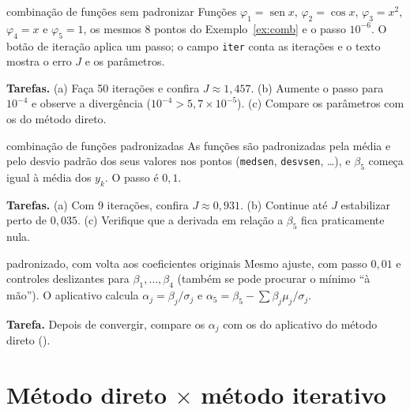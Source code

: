 \begin{atividade}{combinação de funções sem padronizar}{\arqGDComb}
Funções $\varphi_1=\operatorname{sen}x$, $\varphi_2=\cos x$, $\varphi_3=x^2$, $\varphi_4=x$ e $\varphi_5=1$,
os mesmos 8 pontos do Exemplo~\ref{ex:comb} e o passo $10^{-6}$. O botão de iteração aplica um passo; o campo
\texttt{iter} conta as iterações e o texto mostra o erro $J$ e os parâmetros.

\textbf{Tarefas.} (a) Faça 50 iterações e confira $J\approx1{,}457$. (b) Aumente o passo para $10^{-4}$ e
observe a divergência ($10^{-4}>5{,}7\times10^{-5}$). (c) Compare os parâmetros com os do método direto.
\end{atividade}

\begin{atividade}{combinação de funções padronizadas}{\arqGDEsc}
As funções são padronizadas pela média e pelo desvio padrão dos seus valores nos pontos
(\texttt{medsen}, \texttt{desvsen}, \dots), e $\beta_5$ começa igual à média dos $y_k$. O passo é $0{,}1$.

\textbf{Tarefas.} (a) Com 9 iterações, confira $J\approx0{,}931$. (b) Continue até $J$ estabilizar perto de
$0{,}035$. (c) Verifique que a derivada em relação a $\beta_5$ fica praticamente nula.
\end{atividade}

\begin{atividade}{padronizado, com volta aos coeficientes originais}{\arqGDPadr}
Mesmo ajuste, com passo $0{,}01$ e controles deslizantes para $\beta_1,\dots,\beta_4$ (também se pode
procurar o mínimo ``à mão''). O aplicativo calcula $\alpha_j=\beta_j/\sigma_j$ e
$\alpha_5=\beta_5-\sum\beta_j\mu_j/\sigma_j$.

\textbf{Tarefa.} Depois de convergir, compare os $\alpha_j$ com os do aplicativo do método direto
().
\end{atividade}

\section{Método direto \texorpdfstring{$\times$}{x} método iterativo}

